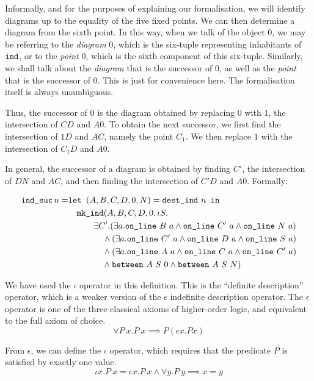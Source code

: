 Informally, and for the purposes of explaining our formalisation, we will identify diagrams up to the equality of the five fixed points. We can then determine a diagram from the sixth point. In this way, when we talk of the object $0$, we may be referring to the \emph{diagram} 0, which is the six-tuple representing inhabitants of $\texttt{ind}$, or to the \emph{point} 0, which is the sixth component of this six-tuple. Similarly, we shall talk about the \emph{diagram} that is the successor of 0, as well as the \emph{point} that is the successor of 0. This is just for convenience here. The formalisation itself is always unambiguous.

Thus, the successor of $0$ is the diagram obtained by replacing $0$ with $1$, the intersection of $CD$ and $A0$. To obtain the next successor, we first find the intersection of $1D$ and $AC$, namely the point $C_1$. We then replace $1$ with the intersection of $C_1D$ and $A0$. 

In general, the successor of a diagram is obtained by finding $C'$, the intersection of $DN$ and $AC$, and then finding the intersection of $C'D$ and $A0$. Formally:

\begin{align*}
\code{ind\_suc}\, n =& \code{let } (A,B,C,D,0,N) = \code{dest\_ind}\ n \code{ in}\\
&\quad \code{mk\_ind} (A,B,C,D,0,\iota S.\\
&\quad\qquad \exists C'. (\exists a. \online{B}{a} \wedge \online{C'}{a} \wedge \online{N}{a})\\
&\qquad\qquad \wedge (\exists a. \online{C'}{a} \wedge \online{D}{a} \wedge \online{S}{a})\\
&\qquad\qquad \wedge (\exists a. \online{A}{a} \wedge \online{C}{a} \wedge \online{C'}{a})\\
&\qquad\qquad \wedge \between{A}{S}{0} \wedge \between{A}{S}{N})
\end{align*}

We have used the $\iota$ operator in this definition. This is the ``definite description'' operator, which is a weaker version of the $\epsilon$ indefinite description operator. The $\epsilon$ operator is one of the three classical axioms of higher-order logic, and equivalent to the full axiom of choice.
\begin{displaymath}
\forall P\ x. P\ x \implies P (\epsilon x. P x)
\end{displaymath}

From $\epsilon$, we can define the $\iota$ operator, which requires that the predicate $P$ is satisfied by exactly one value. 
\begin{displaymath}
  \iota x. P\ x = \epsilon x. P\ x \wedge \forall y. P\ y \implies x = y
\end{displaymath}

